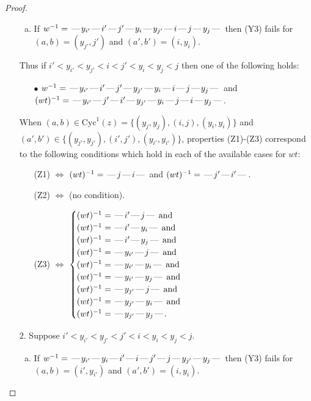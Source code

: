 \documentclass[10pt]{article}
\theoremstyle{definition}
\theoremstyle{definition}
\def\dash{\text{\hspace{0.5mm}---\hspace{0.5mm}}}
\def\Cyc{\mathrm{Cyc}}
\begin{document}
\begin{proof}
\begin{enumerate}
\begin{enumerate}[(a)]
\item If $w^{-1} = \dash y_{i'}\dash i'\dash j'\dash y_i\dash y_{j'}\dash i\dash j\dash y_j\dash $ then (Y3) fails for $(a,b)=(y_{j'},j')$ and $(a',b')=(i,y_i)$.
\end{enumerate}
Thus if $i' < y_{i'} < y_{j'} < i < j' < y_i < y_j < j$ then one of the following holds:
\begin{enumerate}
\item[$\bullet$] $w^{-1} = \dash y_{i'}\dash i'\dash j'\dash y_{j'}\dash y_i\dash i\dash j\dash y_j\dash $ and $(wt)^{-1} = \dash y_{i'}\dash j'\dash i'\dash y_{j'}\dash y_i\dash j\dash i\dash y_j\dash $.
\end{enumerate}
When $(a,b)\in\Cyc^1(z)=\{(y_j,y_j),(i,j),(y_i,y_i)\}$ and $(a',b')\in\{(y_{j'},y_{j'}),(i',j'),(y_{i'},y_{i'})\}$,
properties (Z1)-(Z3) correspond to the following conditions which
hold in each of the available cases for $wt$:
\begin{enumerate}
\item[](Z1) $\Leftrightarrow$ $(wt)^{-1} = \dash j \dash i \dash$  and $(wt)^{-1} = \dash j' \dash i' \dash$.
\item[](Z2) $\Leftrightarrow$ (no condition).
\item[](Z3) $\Leftrightarrow$ $\begin{cases}\text{$(wt)^{-1} = \dash i' \dash j \dash$}\text{ and }\\
\text{$(wt)^{-1} = \dash i' \dash y_i \dash$}\text{ and }\\
\text{$(wt)^{-1} = \dash i' \dash y_j \dash$}\text{ and }\\
\text{$(wt)^{-1} = \dash y_{i'} \dash j \dash$}\text{ and }\\
\text{$(wt)^{-1} = \dash y_{i'} \dash y_i \dash$}\text{ and }\\
\text{$(wt)^{-1} = \dash y_{i'} \dash y_j \dash$}\text{ and }\\
\text{$(wt)^{-1} = \dash y_{j'} \dash j \dash$}\text{ and }\\
\text{$(wt)^{-1} = \dash y_{j'} \dash y_i \dash$}\text{ and }\\
\text{$(wt)^{-1} = \dash y_{j'} \dash y_j \dash$}.\end{cases}$
\end{enumerate}
\item[$2$.] Suppose $i' < y_{i'} < y_{j'} < j' < i < y_i < y_j < j$.
\begin{enumerate}[(a)]
\item If $w^{-1} = \dash y_{i'}\dash y_i\dash i'\dash i\dash j'\dash j\dash y_{j'}\dash y_j\dash $ then (Y3) fails for $(a,b)=(i',y_{i'})$ and $(a',b')=(i,y_i)$.

\end{enumerate}
\end{enumerate}
\end{proof}
\end{document}
